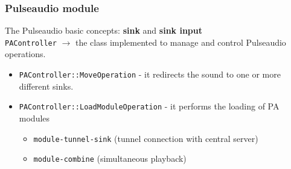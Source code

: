 \documentclass{beamer}
\begin{document}
	\begin{frame}
		\frametitle{Pulseaudio module}
		The Pulseaudio basic concepts: \textbf{sink} and \textbf{sink input}\\
		\vspace{0.5cm}
		\texttt{PAController} $ \rightarrow $ the class implemented to manage and control Pulseaudio operations.
		\begin{itemize}
		\item \texttt{PAController::MoveOperation} - it redirects the sound to one or more different sinks.
		\item \texttt{PAController::LoadModuleOperation} - it performs the loading of PA modules
			\begin{itemize}
			\item \texttt{module-tunnel-sink} (tunnel connection with central server)
			\item \texttt{module-combine} (simultaneous playback)
			\end{itemize}
		\end{itemize}
	
	\end{frame}
	
\end{document}
